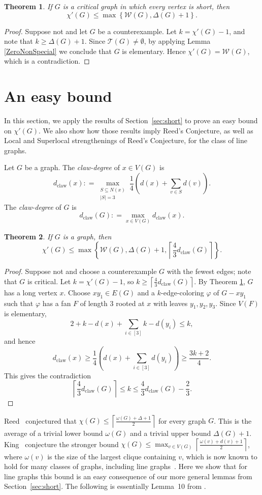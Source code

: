 \documentclass[12pt]{amsart}
\theoremstyle{plain}
\newtheorem{thm}{Theorem}
\theoremstyle{definition}
\theoremstyle{remark}
\newcommand{\fancy}[1]{\mathcal{#1}}
\newcommand{\W}{\fancy{W}}
\newcommand{\T}{\fancy{T}}
\newcommand{\set}[1]{\left\{ #1 \right\}}
\newcommand{\card}[1]{\left|#1\right|}
\newcommand{\ceil}[1]{\left\lceil#1\right\rceil}
\newcommand{\irange}[1]{\left[#1\right]}
\newcommand{\parens}[1]{\left( #1 \right)}
\newcommand{\DefinedAs}{\mathrel{\mathop:}=}
\newcommand{\dclaw}[1]{d_{\text{claw}}\left( #1 \right)}
\newcommand{\vph}{\varphi}
\def\aftermath{\par\vspace{-\belowdisplayskip}\vspace{-\parskip}\vspace{-\baselineskip}}
\begin{document}
\begin{thm}\label{AllSpecialImpliesElementary}
If $G$ is a critical graph in which every vertex is short, then
\[\chi'(G) \le \max \set{\W(G), \Delta(G) + 1}.\]
\end{thm}
\begin{proof}
Suppose not and let $G$ be a counterexample. %
Let $k = \chi'(G) - 1$, and note that $k \ge \Delta(G) + 1$.  
Since $\T(G) \ne \emptyset$, by applying Lemma \ref{ZeroNonSpecial} we conclude
that $G$ is elementary.  Hence $\chi'(G) = \W(G)$, which is a
contradiction.
\end{proof}

\section{An easy bound}
In this section, we apply the results of Section~\ref{sec:short} to prove an
easy bound on $\chi'(G)$.  We also show how those results imply Reed's Conjecture, as
well as Local and Superlocal strengthenings of Reed's Conjecture, for the class
of line graphs.

Let $G$ be a graph.  The \emph{claw-degree} of $x \in V(G)$ is 
\[\dclaw{x} \DefinedAs \max_{\substack{S \subseteq N(x) \\ \card{S} = 3}}\frac14 \parens{d(x) + \sum_{v \in S} d(v)}.\]
The \emph{claw-degree} of $G$ is 
\[\dclaw{G} \DefinedAs \max_{x \in V(G)} \dclaw{x}.\]
\begin{thm}
\label{EasyBound}
If $G$ is a graph, then
\[\chi'(G) \le \max\set{\W(G), \Delta(G) + 1, \ceil{\frac43\dclaw{G}}}.\]
\end{thm}
\begin{proof}
Suppose not and choose a counterexample $G$ with the fewest edges; note that $G$
is critical. 
Let $k=\chi'(G)-1$, so $k \ge \ceil{\frac43\dclaw{G}}$. 
By Theorem \ref{AllSpecialImpliesElementary}, $G$ has a long vertex $x$.
Choose $xy_1 \in E(G)$ and a $k$-edge-coloring $\vph$ of $G - xy_1$ such that
$\vph$ has a fan $F$ of length $3$ rooted at $x$ with leaves $y_1, y_2, y_3$.  
Since $V(F)$ is elementary, 
\[2 + k - d(x) + \sum_{i \in \irange{3}} k-d(y_i) \le k,\]
and hence
\[\dclaw{x} \ge \frac14\parens{d(x) + \sum_{i \in \irange{3}} d(y_i)} \ge \frac{3k+2}{4}.\]
This gives the contradiction
\[\ceil{\frac43\dclaw{G}} \le k \le \frac43\dclaw{G} - \frac23.\]
\aftermath
\end{proof}

Reed~\cite{Reed1998omega} conjectured that $\chi(G)\le
\ceil{\frac{\omega(G)+\Delta+1}2}$ for every
graph $G$.  This is the average of a trivial lower bound $\omega(G)$ and a
trivial upper bound $\Delta(G)+1$.  King~\cite{King} conjecture the stronger
bound $\chi(G)\le \max_{v\in V(G)}\ceil{\frac{\omega(v)+d(v)+1}2}$, where
$\omega(v)$ is the size of the largest clique containing $v$, which is now known
to hold for many classes of graphs, including line graphs~\cite{CKPS}.  Here we
show that for line graphs this bound is an easy consequence of our more general
lemmas from Section~\ref{sec:short}.  The following is essentially Lemma~10 from
\cite{CKPS}.
\end{document}
